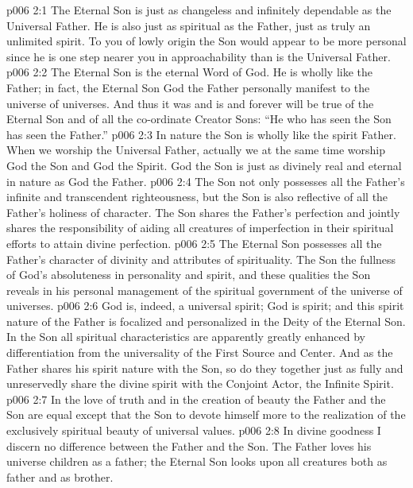 \vs p006 2:1 The Eternal Son is just as changeless and infinitely dependable as the Universal Father. He is also just as spiritual as the Father, just as truly an unlimited spirit. To you of lowly origin the Son would appear to be more personal since he is one step nearer you in approachability than is the Universal Father.
\vs p006 2:2 The Eternal Son is the eternal Word of God. He is wholly like the Father; in fact, the Eternal Son  God the Father personally manifest to the universe of universes. And thus it was and is and forever will be true of the Eternal Son and of all the co\hyp{}ordinate Creator Sons: “He who has seen the Son has seen the Father.”
\vs p006 2:3 In nature the Son is wholly like the spirit Father. When we worship the Universal Father, actually we at the same time worship God the Son and God the Spirit. God the Son is just as divinely real and eternal in nature as God the Father.
\vs p006 2:4 The Son not only possesses all the Father’s infinite and transcendent righteousness, but the Son is also reflective of all the Father’s holiness of character. The Son shares the Father’s perfection and jointly shares the responsibility of aiding all creatures of imperfection in their spiritual efforts to attain divine perfection.\plusone
\vs p006 2:5 The Eternal Son possesses all the Father’s character of divinity and attributes of spirituality. The Son  the fullness of God’s absoluteness in personality and spirit, and these qualities the Son reveals in his personal management of the spiritual government of the universe of universes.
\vs p006 2:6 God is, indeed, a universal spirit; God is spirit; and this spirit nature of the Father is focalized and personalized in the Deity of the Eternal Son. In the Son all spiritual characteristics are apparently greatly enhanced by differentiation from the universality of the First Source and Center. And as the Father shares his spirit nature with the Son, so do they together just as fully and unreservedly share the divine spirit with the Conjoint Actor, the Infinite Spirit.
\vs p006 2:7 In the love of truth and in the creation of beauty the Father and the Son are equal except that the Son  to devote himself more to the realization of the exclusively spiritual beauty of universal values.
\vs p006 2:8 In divine goodness I discern no difference between the Father and the Son. The Father loves his universe children as a father; the Eternal Son looks upon all creatures both as father and as brother.
